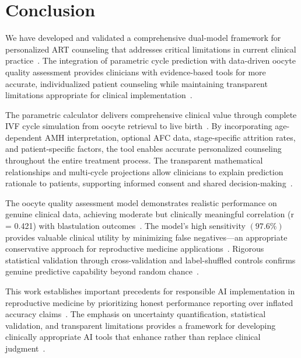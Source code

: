 \section{Conclusion}\label{sec:conclusion}

We have developed and validated a comprehensive dual-model framework for personalized ART counseling that addresses critical limitations in current clinical practice~\cite{gameiro2023understanding,asrm2017embryo}. The integration of parametric cycle prediction with data-driven oocyte quality assessment provides clinicians with evidence-based tools for more accurate, individualized patient counseling while maintaining transparent limitations appropriate for clinical implementation~\cite{fda2022clinical}.

The parametric calculator delivers comprehensive clinical value through complete IVF cycle simulation from oocyte retrieval to live birth~\cite{lee2017amh,song2021amh}. By incorporating age-dependent AMH interpretation, optional AFC data, stage-specific attrition rates, and patient-specific factors, the tool enables accurate personalized counseling throughout the entire treatment process. The transparent mathematical relationships and multi-cycle projections allow clinicians to explain prediction rationale to patients, supporting informed consent and shared decision-making~\cite{beauchamp2019principles,asrm2021counselors}.

The oocyte quality assessment model demonstrates realistic performance on genuine clinical data, achieving moderate but clinically meaningful correlation (r = 0.421) with blastulation outcomes~\cite{varoquaux2022machine}. The model's high sensitivity $(97.6\%)$ provides valuable clinical utility by minimizing false negatives—an appropriate conservative approach for reproductive medicine applications~\cite{cutting2008elective}. Rigorous statistical validation through cross-validation and label-shuffled controls confirms genuine predictive capability beyond random chance~\cite{cohen1988statistical,mann1947test}.

This work establishes important precedents for responsible AI implementation in reproductive medicine by prioritizing honest performance reporting over inflated accuracy claims~\cite{rudin2019stop,topol2019high}. The emphasis on uncertainty quantification, statistical validation, and transparent limitations provides a framework for developing clinically appropriate AI tools that enhance rather than replace clinical judgment~\cite{rajkomar2019machine}.

